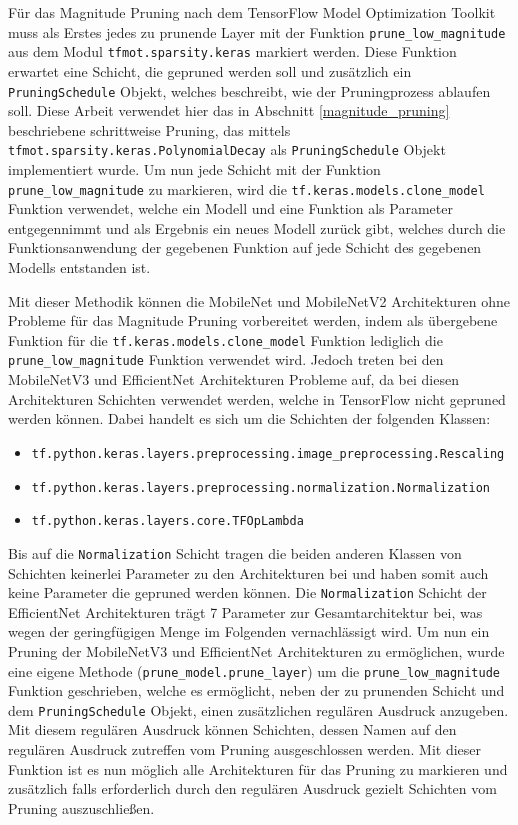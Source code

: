 Für das Magnitude Pruning nach dem TensorFlow Model Optimization Toolkit muss als Erstes jedes zu prunende Layer mit der Funktion \lstinline{prune_low_magnitude} aus dem Modul \lstinline{tfmot.sparsity.keras} markiert werden. Diese Funktion erwartet eine Schicht, die gepruned werden soll und zusätzlich ein \lstinline{PruningSchedule} Objekt, welches beschreibt, wie der Pruningprozess ablaufen soll. Diese Arbeit verwendet hier das in Abschnitt \ref{magnitude_pruning} beschriebene schrittweise Pruning, das mittels \lstinline{tfmot.sparsity.keras.PolynomialDecay} als \lstinline{PruningSchedule} Objekt implementiert wurde. Um nun jede Schicht mit der Funktion \lstinline{prune_low_magnitude} zu markieren, wird die \lstinline{tf.keras.models.clone_model} Funktion verwendet, welche ein Modell und eine Funktion als Parameter entgegennimmt und als Ergebnis ein neues Modell zurück gibt, welches durch die Funktionsanwendung der gegebenen Funktion auf jede Schicht des gegebenen Modells entstanden ist.

Mit dieser Methodik können die MobileNet und MobileNetV2 Architekturen ohne Probleme für das Magnitude Pruning vorbereitet werden, indem als übergebene Funktion für die \lstinline{tf.keras.models.clone_model} Funktion lediglich die \lstinline{prune_low_magnitude} Funktion verwendet wird. Jedoch treten bei den MobileNetV3 und EfficientNet Architekturen Probleme auf, da bei diesen Architekturen Schichten verwendet werden, welche in TensorFlow nicht gepruned werden können. Dabei handelt es sich um die Schichten der folgenden Klassen:

\begin{itemize}
\item \lstinline{tf.python.keras.layers.preprocessing.image_preprocessing.Rescaling}
\item \lstinline{tf.python.keras.layers.preprocessing.normalization.Normalization}
\item \lstinline{tf.python.keras.layers.core.TFOpLambda}
\end{itemize}

Bis auf die \lstinline{Normalization} Schicht tragen die beiden anderen Klassen von Schichten keinerlei Parameter zu den Architekturen bei und haben somit auch keine Parameter die gepruned werden können. Die \lstinline{Normalization} Schicht der EfficientNet Architekturen trägt 7 Parameter zur Gesamtarchitektur bei, was wegen der geringfügigen Menge im Folgenden vernachlässigt wird. Um nun ein Pruning der MobileNetV3 und EfficientNet Architekturen zu ermöglichen, wurde eine eigene Methode (\lstinline{prune_model.prune_layer}) um die \lstinline{prune_low_magnitude} Funktion geschrieben, welche es ermöglicht, neben der zu prunenden Schicht und dem \lstinline{PruningSchedule} Objekt, einen zusätzlichen regulären Ausdruck anzugeben. Mit diesem regulären Ausdruck können Schichten, dessen Namen auf den regulären Ausdruck zutreffen vom Pruning ausgeschlossen werden. Mit dieser Funktion ist es nun möglich alle Architekturen für das Pruning zu markieren und zusätzlich falls erforderlich durch den regulären Ausdruck gezielt Schichten vom Pruning auszuschließen.

